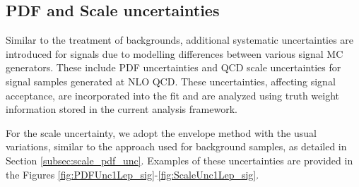 \label{subsec:sig_uncer}


\subsection{PDF and Scale uncertainties}
\label{subsec:sig_uncer_scales_PDF}


Similar to the treatment of backgrounds, additional systematic uncertainties are introduced for signals due to modelling differences between various signal MC generators. 
These include PDF uncertainties and QCD scale uncertainties for signal samples generated at NLO QCD.
These uncertainties, affecting signal acceptance, are incorporated into the fit and are analyzed using truth weight information stored in the current analysis framework.

For the scale uncertainty, we adopt the envelope method with the usual variations, similar to the approach used for background samples, as detailed in Section \ref{subsec:scale_pdf_unc}. 
Examples of these uncertainties are provided in the Figures \ref{fig:PDFUnc1Lep_sig}-\ref{fig:ScaleUnc1Lep_sig}.

